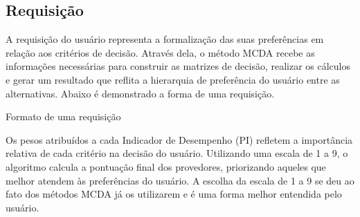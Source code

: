 \documentclass[12pt]{article}[abntex2]
\begin{document}
\subsection{Requisição}
A requisição do usuário representa a formalização das suas preferências em relação aos critérios de decisão. Através dela, o método MCDA recebe as informações necessárias para construir as matrizes de decisão, realizar os cálculos e gerar um resultado que reflita a hierarquia de preferência do usuário entre as alternativas. Abaixo é demonstrado a forma de uma requisição.

\begin{table}[htbp]
\centering
{}
\caption{Formato de uma requisição}
\label{tab:requisicao}
\end{table}

Os pesos atribuídos a cada Indicador de Desempenho (PI) refletem a importância relativa de cada critério na decisão do usuário. Utilizando uma escala de 1 a 9, o algoritmo calcula a pontuação final dos provedores, priorizando aqueles que melhor atendem às preferências do usuário.
A escolha da escala de 1 a 9 se deu ao fato dos métodos MCDA já os utilizarem e é uma forma melhor entendida pelo usuário. 
\newpage
\end{document}
